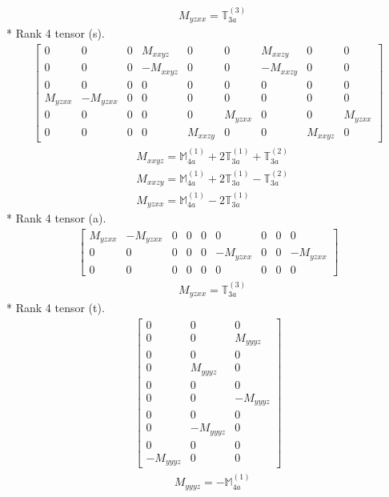\documentclass[fleqn,8pt,landscape]{jsarticle}
\begin{document}
\begin{align*}
& M_{yzxx} = \mathbb{T}_{3a}^{(3)}
\end{align*}
* Rank 4 tensor (s).
\begin{align*}
\begin{bmatrix} 0 & 0 & 0 & M_{xxyz} & 0 & 0 & M_{xxzy} & 0 & 0 \\ 0 & 0 & 0 & - M_{xxyz} & 0 & 0 & - M_{xxzy} & 0 & 0 \\ 0 & 0 & 0 & 0 & 0 & 0 & 0 & 0 & 0 \\ M_{yzxx} & - M_{yzxx} & 0 & 0 & 0 & 0 & 0 & 0 & 0 \\ 0 & 0 & 0 & 0 & 0 & M_{yzxx} & 0 & 0 & M_{yzxx} \\ 0 & 0 & 0 & 0 & M_{xxzy} & 0 & 0 & M_{xxyz} & 0 \end{bmatrix}
\end{align*}
\begin{align*}
& M_{xxyz} = \mathbb{M}_{4a}^{(1)} + 2 \mathbb{T}_{3a}^{(1)} + \mathbb{T}_{3a}^{(2)} \\
& M_{xxzy} = \mathbb{M}_{4a}^{(1)} + 2 \mathbb{T}_{3a}^{(1)} - \mathbb{T}_{3a}^{(2)} \\
& M_{yzxx} = \mathbb{M}_{4a}^{(1)} - 2 \mathbb{T}_{3a}^{(1)}
\end{align*}
* Rank 4 tensor (a).
\begin{align*}
\begin{bmatrix} M_{yzxx} & - M_{yzxx} & 0 & 0 & 0 & 0 & 0 & 0 & 0 \\ 0 & 0 & 0 & 0 & 0 & - M_{yzxx} & 0 & 0 & - M_{yzxx} \\ 0 & 0 & 0 & 0 & 0 & 0 & 0 & 0 & 0 \end{bmatrix}
\end{align*}
\begin{align*}
& M_{yzxx} = \mathbb{T}_{3a}^{(3)}
\end{align*}
* Rank 4 tensor (t).
\begin{align*}
\begin{bmatrix} 0 & 0 & 0 \\ 0 & 0 & M_{yyyz} \\ 0 & 0 & 0 \\ 0 & M_{yyyz} & 0 \\ 0 & 0 & 0 \\ 0 & 0 & - M_{yyyz} \\ 0 & 0 & 0 \\ 0 & - M_{yyyz} & 0 \\ 0 & 0 & 0 \\ - M_{yyyz} & 0 & 0 \end{bmatrix}
\end{align*}
\begin{align*}
& M_{yyyz} = - \mathbb{M}_{4a}^{(1)}
\end{align*}
\end{document}

